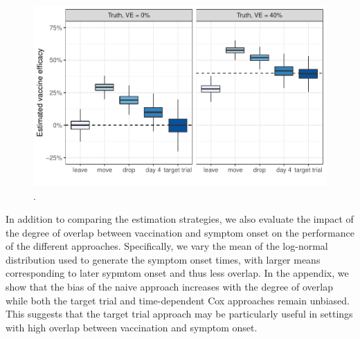 \documentclass[11pt]{article}
\begin{document}
\begin{figure}[t]
    \centering
    \includegraphics{../3_figures/sim.pdf}
    \caption{.\label{fig:sim_results}}
\end{figure}

In addition to comparing the estimation strategies, we also evaluate the impact of the degree of overlap between vaccination and symptom onset on the performance of the different approaches. Specifically, we vary the mean of the log-normal distribution used to generate the symptom onset times, with larger means corresponding to later sypmtom onset and thus less overlap. In the appendix, we show that the bias of the naive approach increases with the degree of overlap while both the target trial and time-dependent Cox approaches remain unbiased. This suggests that the target trial approach may be particularly useful in settings with high overlap between vaccination and symptom onset.

\end{document}
